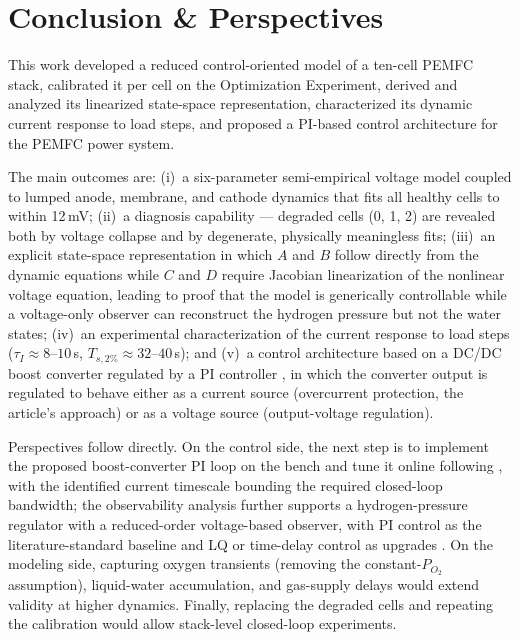 \documentclass[11pt,a4paper]{article}
\begin{document}
\section{Conclusion \& Perspectives}
\label{sec:conclusion}

This work developed a reduced control-oriented model of a ten-cell PEMFC stack,
calibrated it per cell on the Optimization Experiment, derived and analyzed its
linearized state-space representation, characterized its dynamic current response
to load steps, and proposed a PI-based control architecture for the PEMFC power
system.

The main outcomes are: (i)~a six-parameter semi-empirical voltage model coupled to
lumped anode, membrane, and cathode dynamics that fits all healthy cells to within
12\,mV; (ii)~a diagnosis capability --- degraded cells (0, 1, 2) are revealed both
by voltage collapse and by degenerate, physically meaningless fits;
(iii)~an explicit state-space representation in which $A$ and $B$ follow directly
from the dynamic equations while $C$ and $D$ require Jacobian linearization of the
nonlinear voltage equation, leading to proof that the model is generically
controllable while a voltage-only observer can reconstruct the hydrogen pressure
but not the water states; (iv)~an experimental characterization of the current
response to load steps ($\tau_I\approx 8$--$10$\,s,
$T_{s,2\%}\approx 32$--$40$\,s); and (v)~a control architecture based on a DC/DC
boost converter regulated by a PI controller \cite{derbeli2017}, in which the
converter output is regulated to behave either as a current source (overcurrent
protection, the article's approach) or as a voltage source (output-voltage
regulation).

Perspectives follow directly. On the control side, the next step is to implement
the proposed boost-converter PI loop on the bench and tune it online following
\cite{derbeli2017}, with the identified current timescale bounding the required
closed-loop bandwidth; the observability analysis further supports a
hydrogen-pressure regulator with a reduced-order voltage-based observer, with PI
control as the literature-standard baseline \cite{zhu2017,derbeli2017} and LQ or
time-delay control as upgrades \cite{pukrushpan2003,kim2010}. On the modeling
side, capturing oxygen transients (removing the constant-$P_{O_2}$ assumption),
liquid-water accumulation, and gas-supply delays \cite{kharrat2025} would extend
validity at higher dynamics. Finally, replacing the degraded cells and repeating
the calibration would allow stack-level closed-loop experiments.
\end{document}
